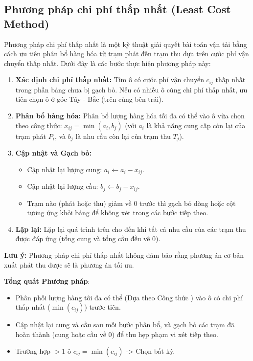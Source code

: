 \subsection{Phương pháp chi phí thấp nhất (Least Cost Method)}

Phương pháp chi phí thấp nhất là một kỹ thuật giải quyết bài toán vận tải bằng cách ưu tiên phân bổ hàng hóa từ trạm phát đến trạm thu dựa trên cước phí vận chuyển thấp nhất. Dưới đây là các bước thực hiện phương pháp này:

\begin{enumerate}
    \item \textbf{Xác định chi phí thấp nhất:} Tìm ô có cước phí vận chuyển $c_{ij}$ thấp nhất trong phần bảng chưa bị gạch bỏ. Nếu có nhiều ô cùng chi phí thấp nhất, ưu tiên chọn ô ở góc Tây - Bắc (trên cùng bên trái).
    
    \item \textbf{Phân bổ hàng hóa:} Phân bổ lượng hàng hóa tối đa có thể vào ô vừa chọn theo công thức: $x_{ij} = \min(a_i, b_j)$ (với $a_i$ là khả năng cung cấp còn lại của trạm phát $P_i$, và $b_j$ là nhu cầu còn lại của trạm thu $T_j$).
    
    \item \textbf{Cập nhật và Gạch bỏ:} 
    \begin{itemize}
        \item Cập nhật lại lượng cung: $a_i \leftarrow a_i - x_{ij}$.
        \item Cập nhật lại lượng cầu: $b_j \leftarrow b_j - x_{ij}$.
        \item Trạm nào (phát hoặc thu) giảm về 0 trước thì gạch bỏ dòng hoặc cột tương ứng khỏi bảng để không xét trong các bước tiếp theo.
    \end{itemize}
    
    \item \textbf{Lặp lại:} Lặp lại quá trình trên cho đến khi tất cả nhu cầu của các trạm thu được đáp ứng (tổng cung và tổng cầu đều về 0).
\end{enumerate}

\textbf{Lưu ý:} Phương pháp chi phí thấp nhất không đảm bảo rằng phương án cơ bản xuất phát thu được sẽ là phương án tối ưu.

\textbf{Tổng quát Phương pháp}:
\begin{itemize}
    \item Phân phối lượng hàng tôi đa có thể (Dựa theo Công thức ) vào ô có chi phí thấp nhất ($\min(c_{ij})$) trước tiên.
    \item Cập nhật lại cung và cầu sau mỗi bước phân bổ, và gạch bỏ các trạm đã hoàn thành (cung hoặc cầu về 0) để thu hẹp phạm vi xét tiếp theo.
    \item Trường hợp $> 1$ ô $c_{ij} = \min(c_{ij})$ -> Chọn bất kỳ.
\end{itemize}

